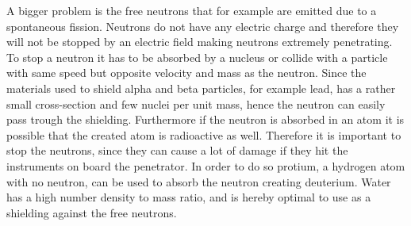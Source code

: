 \noindent
A bigger problem is the free neutrons that for example are emitted due to a spontaneous fission.  Neutrons do not have any electric charge and therefore they will not be stopped by an electric field making neutrons extremely penetrating. To stop a neutron it has to be absorbed by a nucleus or collide with a particle with same speed but opposite velocity and mass as the neutron. Since the materials used to shield alpha and beta particles, for example lead, has a rather small cross-section and few nuclei per unit mass, hence the neutron can easily pass trough the shielding. Furthermore if the neutron is absorbed in an atom it is possible that the created atom is radioactive as well. Therefore it is important to stop the neutrons, since they can cause a lot of damage if they hit the instruments on board the penetrator. In order to do so protium, a hydrogen atom with no neutron, can be used to absorb the neutron creating deuterium. Water has a high number density to mass ratio, and is hereby optimal to use as a shielding against the free neutrons.

